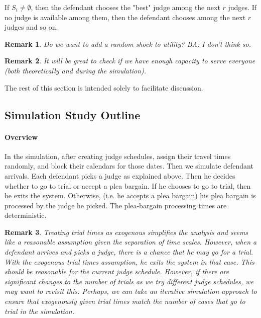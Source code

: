 \documentclass[11pt, oneside]{article}   	%
\theoremstyle{ModifiedStyle}
\newtheorem{remark}{Remark}
\begin{document}
If $S_i \neq \emptyset$, then the defendant chooses the "best" judge among the next $r$ judges. If no judge is available among them, then the defendant chooses among the next $r$ judges and so on.

\begin{remark}
	Do we want to add a random shock to utility? BA: I don't think so.
\end{remark}

\begin{remark}
	It will be great to check if we have enough capacity to serve everyone (both theoretically and during the simulation).
\end{remark}

The rest of this section is intended solely to facilitate discussion.
%
\subsection{Simulation Study Outline}

\paragraph{Overview} In the simulation, after creating judge schedules, assign their travel times randomly, and block their calendars for those dates. Then we simulate defendant arrivals. Each defendant picks a judge as explained above. Then he decides whether to go to trial or accept a plea bargain. If he chooses to go to trial, then he exits the system. Otherwise, (i.e. he accepts a plea bargain) his plea bargain is processed by the judge he picked. The plea-bargain processing times are deterministic.

\begin{remark}
	Treating trial times as exogenous simplifies the analysis and seems like a reasonable assumption given the separation of time scales. However, when a defendant arrives and picks a judge, there is a chance that he may go for a trial. With the exogenous trial times assumption, he exits the system in that case. This should be reasonable for the current judge schedule. However, if there are significant changes to the number of trials as we try different judge schedules, we may want to revisit this. Perhaps, we can take an iterative simulation approach to ensure that exogenously given trial times match the number of cases that go to trial in the simulation.
\end{remark}

%
\vspace{-1mm}
\end{document}
